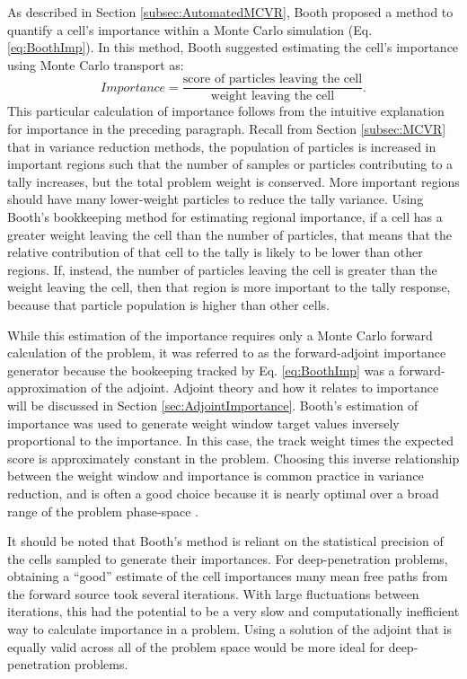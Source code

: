 As described in Section \ref{subsec:AutomatedMCVR}, Booth
\cite{booth_automatic_1982} proposed
a method to quantify a cell's importance within a Monte Carlo simulation
(Eq. \eqref{eq:BoothImp}). In
this method, Booth suggested estimating the cell's importance using Monte Carlo
transport as:
\begin{equation*}
  Importance  = \frac{\text{score of particles leaving the cell}}
                     {\text{weight leaving the cell}}.
\end{equation*}
This particular calculation of importance
follows from the intuitive explanation for importance in the preceding
paragraph. Recall from Section \ref{subsec:MCVR} that in variance reduction
methods, the population of particles is increased in important regions such that
the number of samples or particles contributing to a tally increases, but the
total problem weight is conserved. More important regions should have many
lower-weight particles to reduce the tally variance. Using Booth's bookkeeping
method for estimating regional importance,
if a cell has a greater weight leaving the cell than the number
of particles, that means that the relative contribution of that cell to the
tally is likely to be lower than other regions. If, instead, the number of
particles leaving the cell is greater than the weight leaving the cell, then
that region is more important to the tally response, because that particle
population is higher than other cells.

While this
estimation of the importance requires only a Monte Carlo forward calculation of
the problem, it was referred to as the forward-adjoint importance generator
\cite{booth_automatic_1982, booth_deep_1982, booth_importance_1984} because the
bookeeping tracked by Eq. \eqref{eq:BoothImp} was a forward-approximation of the
adjoint. Adjoint theory and how it relates to importance will be discussed in
Section
\ref{sec:AdjointImportance}.
Booth's estimation of importance was used to generate
weight window target values inversely proportional to the importance.
In this case, the track weight times the expected score is approximately
constant in the problem. Choosing this inverse relationship between the weight
window and importance is common practice in variance reduction, and is often a
good choice because it is nearly optimal over a broad range of the problem
phase-space \cite{booth_common_2012}.

It should be noted that Booth's method is reliant on the statistical
precision of the cells sampled to generate their importances. For
deep-penetration problems, obtaining a ``good'' estimate of the cell importances
many mean free paths from the forward source took several iterations. With
large fluctuations between iterations, this had the potential to
be a very slow and
computationally inefficient way to calculate importance in a problem. Using a
solution of the adjoint that is equally valid across all of the problem space
would be more ideal for deep-penetration problems.

